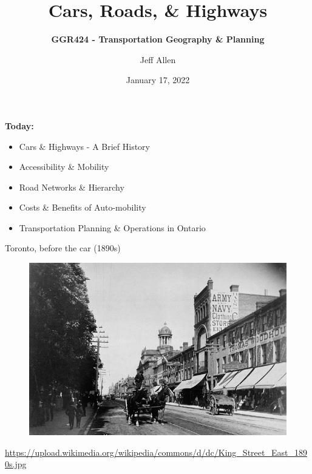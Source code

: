 \documentclass[aspectratio=169]{beamer}
\title{\textbf{Cars, Roads, \& Highways}}
\subtitle{\textbf{GGR424 - Transportation Geography \& Planning}}
\author{Jeff Allen}
\institute{University of Toronto}
\date{January 17, 2022}
\begin{document}
	
\begin{frame}
	\titlepage	
\end{frame}



\begin{frame}
\textbf{Today:}
\begin{itemize}
	\item Cars \& Highways - A Brief History
	\item Accessibility \& Mobility
	\item Road Networks \& Hierarchy
	\item Costs \& Benefits of Auto-mobility
	\item Transportation Planning \& Operations in Ontario
\end{itemize}
\end{frame}






\begin{frame}
	
	Toronto, before the car (1890s)
	
	\begin{figure}
		\centering
		\includegraphics[width=0.8\linewidth]{images/king_east_1890s.jpg}
		
	\end{figure}
	
	\tiny{\url{https://upload.wikimedia.org/wikipedia/commons/d/dc/King_Street_East_1890s.jpg}}
\end{frame}
\end{document}

